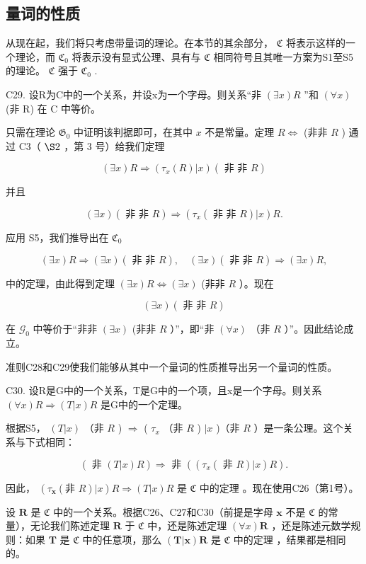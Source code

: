 \subsection{量词的性质}

从现在起，我们将只考虑带量词的理论。在本节的其余部分， \(\mathfrak{C}\) 将表示这样的一个理论，而 \(\mathfrak{C}_0\) 将表示没有显式公理、具有与 \(\mathfrak{C}\) 相同符号且其唯一方案为S1至S5的理论。 \(\mathfrak{C}\) 强于 \(\mathfrak{C}_0\) .

C29. 设R为C中的一个关系，并设x为一个字母。则关系“非 \((\exists x)R\) ”和 \((\forall x)\) (非 R) 在 C 中等价。

只需在理论 \(\mathfrak{G}_0\) 中证明该判据即可，在其中 \(x\) 不是常量。定理 \(R \Longleftrightarrow\) (非非 \(R\) ) 通过 C3（ \(\S 2\) ，第 3 号）给我们定理

\[
(\exists x) R \Longrightarrow (\tau_ {x} (R) | x) (\text { 非   非 } R)
\]

并且

\[
(\exists x) (\text { 非   非 } R) \Longrightarrow (\tau_ {x} (\text { 非   非 } R) | x) R.
\]

应用 S5，我们推导出在 \(\mathfrak{C}_{0}\)

\[
(\exists x) R \Longrightarrow (\exists x) (\text { 非   非 } R), \quad (\exists x) (\text { 非   非 } R) \Longrightarrow (\exists x) R,
\]

中的定理，由此得到定理 \((\exists x)R \Longleftrightarrow (\exists x)\) (非非 \(R\) ）。现在

\[
(\exists x) (\text { 非   非 } R)
\]

在 \(\mathcal{G}_0\) 中等价于“非非 \((\exists x)\) (非非 \(R\) ）”，即“非 \((\forall x)\) （非 \(R\) ）”。因此结论成立。

准则C28和C29使我们能够从其中一个量词的性质推导出另一个量词的性质。

C30. 设R是G中的一个关系，T是G中的一个项，且x是一个字母。则关系 \((\forall x)R \Longrightarrow (T|x)R\) 是G中的一个定理。

根据S5， \((T|x)\) （非 \(R\) ) \(\Longrightarrow\) ( \(\tau_{x}\) （非 \(R\) ) \(|x\) )（非 \(R\) ）是一条公理。这个关系与下式相同：

\[
(\text { 非 } (T | x) R) \Longrightarrow \text { 非 } ((\tau_ {x} (\text { 非 } R) | x) R).
\]

因此， \((\tau_{\mathbf{x}}(\text{非 } R)|x)R \Longrightarrow (T|x)R\) 是 \(\mathfrak{C}\) 中的定理 。现在使用C26（第1号）。

设 \(\pmb{R}\) 是 \(\mathfrak{C}\) 中的一个关系。根据C26、C27和C30（前提是字母 \(\pmb{x}\) 不是 \(\mathfrak{C}\) 的常量），无论我们陈述定理 \(\pmb{R}\) 于 \(\mathfrak{C}\) 中，还是陈述定理 \((\forall x)\pmb{R}\) ，还是陈述元数学规则：如果 \(\pmb{T}\) 是 \(\mathfrak{C}\) 中的任意项，那么 \((\pmb{T}|\pmb{x})\pmb{R}\) 是 \(\mathfrak{C}\) 中的定理 ，结果都是相同的。

